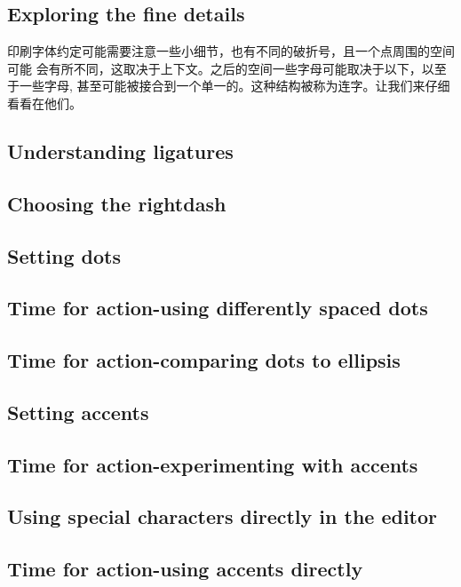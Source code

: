 \subsection{Exploring the fine details}
印刷字体约定可能需要注意一些小细节，也有不同的破折号，且一个点周围的空间可能
会有所不同，这取决于上下文。之后的空间一些字母可能取决于以下，以至于一些字母,
甚至可能被接合到一个单一的。这种结构被称为连字。让我们来仔细看看在他们。
	\subsection{Understanding ligatures}
	\subsection{Choosing the rightdash}
	\subsection{Setting dots}
	\subsection{Time for action-using differently spaced dots}
	\subsection{Time for action-comparing dots to ellipsis}
	\subsection{Setting accents}
	\subsection{Time for action-experimenting with accents}
	\subsection{Using special characters directly in the editor}
	\subsection{Time for action-using accents directly}

